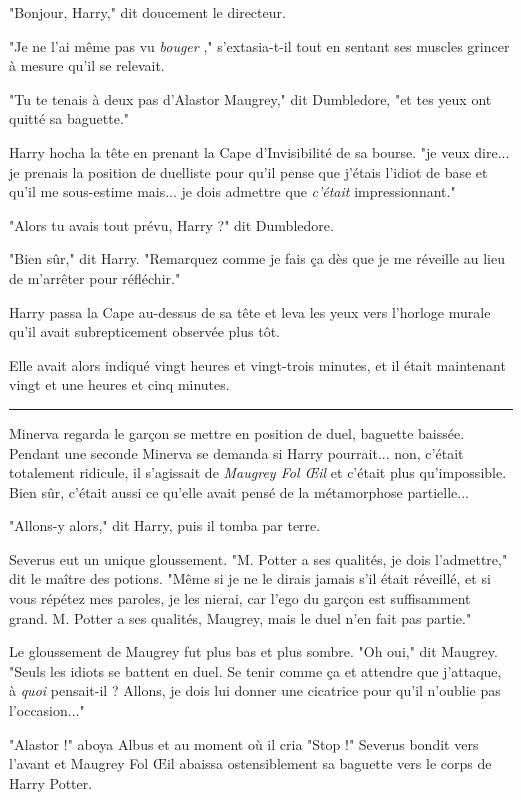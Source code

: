 "Bonjour, Harry," dit doucement le directeur.

"Je ne l'ai même pas vu \emph{bouger} ," s'extasia-t-il tout en sentant ses muscles grincer à mesure qu'il se relevait.

"Tu te tenais à deux pas d'Alastor Maugrey," dit Dumbledore, "et tes yeux ont quitté sa baguette."

Harry hocha la tête en prenant la Cape d'Invisibilité de sa bourse. "je veux dire... je prenais la position de duelliste pour qu'il pense que j'étais l'idiot de base et qu'il me sous-estime mais... je dois admettre que \emph{c'était}  impressionnant."

"Alors tu avais tout prévu, Harry ?" dit Dumbledore.

"Bien sûr," dit Harry. "Remarquez comme je fais ça dès que je me réveille au lieu de m'arrêter pour réfléchir."

Harry passa la Cape au-dessus de sa tête et leva les yeux vers l'horloge murale qu'il avait subrepticement observée plus tôt.

Elle avait alors indiqué vingt heures et vingt-trois minutes, et il était maintenant vingt et une heures et cinq minutes.
\par\noindent\rule{\textwidth}{0.4pt}
Minerva regarda le garçon se mettre en position de duel, baguette baissée. Pendant une seconde Minerva se demanda si Harry pourrait... non, c'était totalement ridicule, il s'agissait de \emph{Maugrey Fol Œil } et c'était plus qu'impossible. Bien sûr, c'était aussi ce qu'elle avait pensé de la métamorphose partielle...

"Allons-y alors," dit Harry, puis il tomba par terre.

Severus eut un unique gloussement. "M. Potter a ses qualités, je dois l'admettre," dit le maître des potions. "Même si je ne le dirais jamais s'il était réveillé, et si vous répétez mes paroles, je les nierai, car l'ego du garçon est suffisamment grand. M. Potter a ses qualités, Maugrey, mais le duel n'en fait pas partie."

Le gloussement de Maugrey fut plus bas et plus sombre. "Oh oui," dit Maugrey. "Seuls les idiots se battent en duel. Se tenir comme ça et attendre que j'attaque, à \emph{quoi}  pensait-il ? Allons, je dois lui donner une cicatrice pour qu'il n'oublie pas l'occasion..."

"Alastor !" aboya Albus et au moment où il cria "Stop !" Severus bondit vers l'avant et Maugrey Fol Œil abaissa ostensiblement sa baguette vers le corps de Harry Potter.

